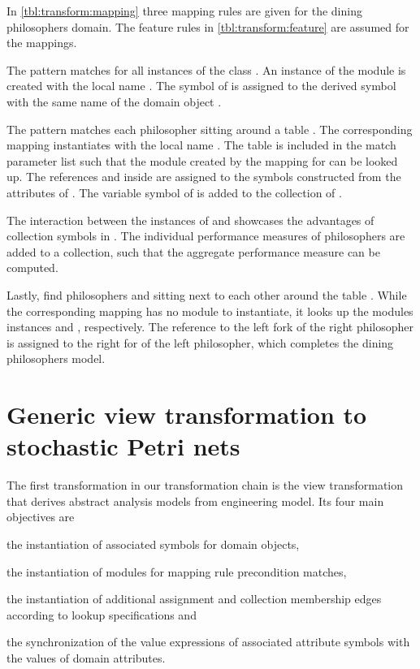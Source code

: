 \begin{runningExample}
  In \vref{tbl:transform:mapping} three mapping rules are given for the dining philosophers domain. The feature rules in \vref{tbl:transform:feature} are assumed for the mappings.

  The pattern  matches for all instances  of the class . An instance of the module  is created with the local name . The symbol  of  is assigned to the derived symbol with the same name of the domain object .

  The pattern  matches each philosopher  sitting around a table . The corresponding mapping instantiates  with the local name . The table  is included in the match parameter list such that the module  created by the mapping  for  can be looked up. The references  and  inside  are assigned to the symbols constructed from the attributes of . The variable symbol  of  is added to the collection  of .

  The interaction between the instances of  and  showcases the advantages of collection symbols in . The individual performance measures  of philosophers are added to a collection, such that the aggregate performance measure  can be computed.

  Lastly,  find philosophers  and  sitting next to each other around the table . While the corresponding mapping has no  module to instantiate, it looks up the modules instances  and , respectively. The reference to the left fork of the right philosopher is assigned to the right for of the left philosopher, which completes the dining philosophers model.
\end{runningExample}

\section{Generic view transformation to stochastic Petri nets}
\label{chap:transform:view}

The first transformation in our transformation chain is the view transformation that derives abstract  analysis models from engineering model. Its four main objectives are
\begin{itemize*}
\item the instantiation of associated symbols for domain objects,
\item the instantiation of  modules for mapping rule precondition matches,
\item the instantiation of additional assignment and collection membership edges according to lookup specifications and
\item the synchronization of the value expressions of associated attribute symbols with the values of domain attributes.
\end{itemize*}

